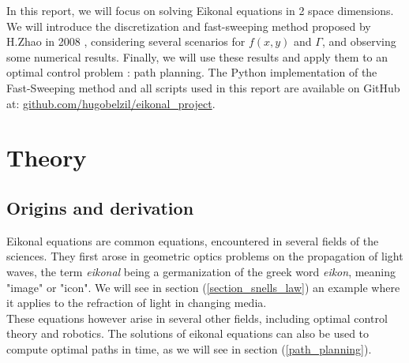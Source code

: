 \documentclass[11pt]{article}
\theoremstyle{definition}
\theoremstyle{remark}
\begin{document}
\noindent In this report, we will focus on solving Eikonal equations in 2 space dimensions. We will introduce the discretization and fast-sweeping method proposed by H.Zhao in 2008 \cite{zhao2005}, considering several scenarios for $f(x,y)$ and $\Gamma$, and observing some numerical results. Finally, we will use these results and apply them to an optimal control problem : path planning. The Python implementation of the Fast-Sweeping method and all scripts used in this report are available on GitHub at: 
\href{https://github.com/hugobelzil/eikonal_project}{github.com/hugobelzil/eikonal\_project}.


\section{Theory}
\subsection{Origins and derivation}
Eikonal equations are common equations, encountered in several fields of the sciences. They first arose in geometric optics problems on the propagation of light waves, the term \textit{eikonal} being a germanization of the greek word \textit{eikon}, meaning "image" or "icon"\cite{wiki-eikonal}. We will see in section (\ref{section_snells_law}) an example where it applies to the refraction of light in changing media. \\

\noindent These equations however arise in several other fields, including optimal control theory and robotics. The solutions of eikonal equations can also be used to compute optimal paths in time, as we will see in section (\ref{path_planning}). \\
\end{document}
